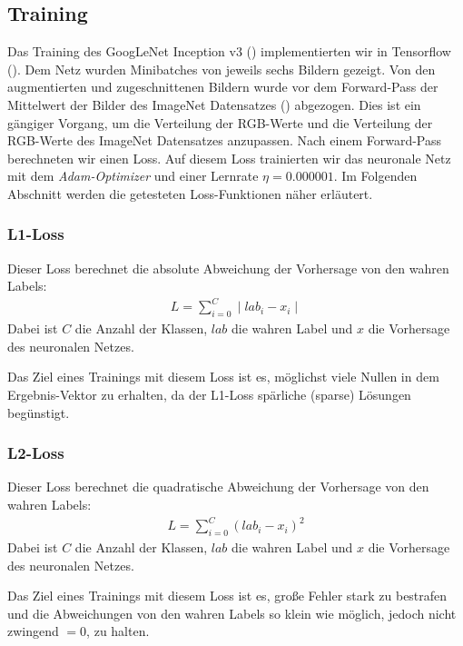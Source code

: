 \subsection{Training}
\label{training}

	Das Training des GoogLeNet Inception v3 (\cite{inception}) implementierten wir in Tensorflow (\cite{tensorflow2015-whitepaper}). Dem Netz wurden Minibatches  von jeweils sechs Bildern gezeigt. Von den augmentierten und zugeschnittenen Bildern wurde vor dem Forward-Pass  der Mittelwert der Bilder des ImageNet Datensatzes (\cite{russakovsky2015imagenet}) abgezogen. Dies ist ein gängiger Vorgang, um die Verteilung der RGB-Werte und die Verteilung der RGB-Werte des ImageNet Datensatzes anzupassen. Nach einem Forward-Pass berechneten wir einen Loss. Auf diesem Loss trainierten wir das neuronale Netz mit dem \textit{Adam-Optimizer} und einer Lernrate $\eta=0.000001$. Im Folgenden Abschnitt werden die getesteten Loss-Funktionen näher erläutert.
	
\subsubsection{L1-Loss}

	Dieser Loss berechnet die absolute Abweichung der Vorhersage von den wahren Labels:
	\begin{align*}
		L = \sum_{i = 0}^C \mid lab_i - x_i\mid
	\end{align*}
	Dabei ist $C$ die Anzahl der Klassen, $lab$ die wahren Label und $x$ die Vorhersage des neuronalen Netzes.
	
	Das Ziel eines Trainings mit diesem Loss ist es, möglichst viele Nullen in dem Ergebnis-Vektor zu erhalten, da der L1-Loss spärliche (sparse) Lösungen begünstigt.

\subsubsection{L2-Loss}
	Dieser Loss berechnet die quadratische Abweichung der Vorhersage von den wahren Labels:
	\begin{align*}
	L = \sum_{i = 0}^C ( lab_i - x_i)^2
	\end{align*}
	Dabei ist $C$ die Anzahl der Klassen, $lab$ die wahren Label und $x$ die Vorhersage des neuronalen Netzes.
	
	Das Ziel eines Trainings mit diesem Loss ist es, große Fehler stark zu bestrafen und die Abweichungen von den wahren Labels so klein wie möglich, jedoch nicht zwingend $=0$, zu halten.
	
